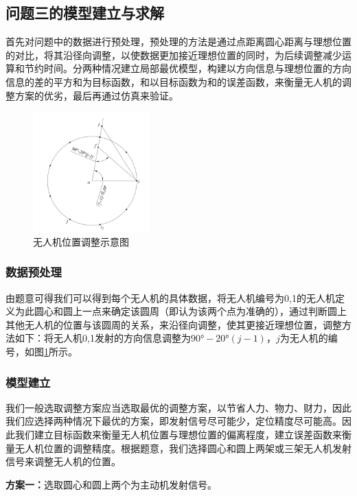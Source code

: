 \documentclass[withoutpreface,bwprint]{cumcmthesis} %
\begin{document}
\subsection{问题三的模型建立与求解}

首先对问题中的数据进行预处理，预处理的方法是通过点距离圆心距离与理想位置的对比，将其沿径向调整，以使数据更加接近理想位置的同时，为后续调整减少运算和节约时间。分两种情况建立局部最优模型，构建以方向信息与理想位置的方向信息的差的平方和为目标函数，和以目标函数为和的误差函数，来衡量无人机的调整方案的优劣，最后再通过仿真来验证。
\begin{figure}[H]
    \centering
    \includegraphics[width=0.4\textwidth]{../../figure/q3_1.png} 
    \caption{无人机位置调整示意图}
    \label{q3_1}    
\end{figure}
\subsubsection{数据预处理}
由题意可得我们可以得到每个无人机的具体数据，将无人机编号为0,1的无人机定义为此圆心和圆上一点来确定该圆周（即认为该两个点为准确的），通过判断圆上其他无人机的位置与该圆周的关系，来沿径向调整，使其更接近理想位置，调整方法如下：将无人机0,1发射的方向信息调整为$90°-20°(j-1)$，$j$为无人机的编号，如图\ref{q3_1}所示。



\subsubsection{模型建立}

我们一般选取调整方案应当选取最优的调整方案，以节省人力、物力、财力，因此我们应选择两种情况下最优的方案，即发射信号尽可能少，定位精度尽可能高。因此我们建立目标函数来衡量无人机位置与理想位置的偏离程度，建立误差函数来衡量无人机位置的调整精度。根据题意，我们选择圆心和圆上两架或三架无人机发射信号来调整无人机的位置。

\noindent \textbf{方案一：}选取圆心和圆上两个为主动机发射信号。
    
\end{document}
